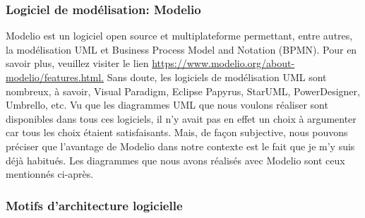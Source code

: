 \subsubsection{Logiciel de modélisation: Modelio}
Modelio est un logiciel open source et multiplateforme permettant, entre autres, la modélisation
UML et Business Process Model and Notation (BPMN). Pour en savoir plus, veuillez visiter le lien
\href{https://www.modelio.org/about-modelio/features.html.}{https://www.modelio.org/about-modelio/features.html.}
Sans doute, les logiciels de modélisation UML sont nombreux, à savoir, Visual Paradigm, Eclipse
Papyrus, StarUML, PowerDesigner, Umbrello, etc. Vu que les diagrammes UML que nous voulons
réaliser sont disponibles dans tous ces logiciels, il n’y avait pas en effet un choix à argumenter car
tous les choix étaient satisfaisants. Mais, de façon subjective, nous pouvons préciser que l’avantage de
Modelio dans notre contexte est le fait que je m’y suis déjà habitués. Les diagrammes que nous avons
réalisés avec Modelio sont ceux mentionnés ci-après.


\subsubsection{Motifs d’architecture logicielle}
